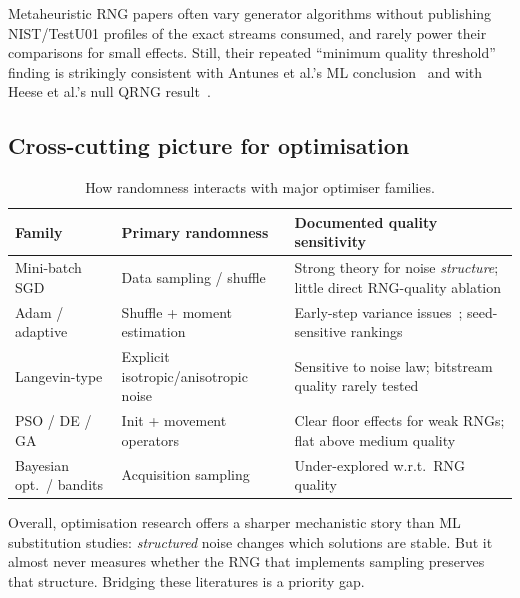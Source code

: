 \begin{remark}
Metaheuristic RNG papers often vary generator algorithms without publishing NIST/TestU01 profiles of the exact streams consumed, and rarely power their comparisons for small effects.
Still, their repeated ``minimum quality threshold'' finding is strikingly consistent with Antunes et al.'s ML conclusion~\cite{antunes2025influence} and with Heese et al.'s null QRNG result~\cite{heese2024biased}.
\end{remark}

\subsection{Cross-cutting picture for optimisation}

\begin{table}[t]
\centering
\caption{How randomness interacts with major optimiser families.}
\label{tab:opt-map}
\begin{tabular}{@{}p{3.2cm}p{4.2cm}p{4.4cm}@{}}
\toprule
\textbf{Family} & \textbf{Primary randomness} & \textbf{Documented quality sensitivity} \\
\midrule
Mini-batch SGD & Data sampling / shuffle & Strong theory for noise \emph{structure}; little direct RNG-quality ablation \\
Adam / adaptive & Shuffle + moment estimation & Early-step variance issues~\cite{liu2020radam}; seed-sensitive rankings \\
Langevin-type & Explicit isotropic/anisotropic noise & Sensitive to noise law; bitstream quality rarely tested \\
PSO / DE / GA & Init + movement operators & Clear floor effects for weak RNGs; flat above medium quality~\cite{bastos2009pso,ma2014comparison} \\
Bayesian opt.\ / bandits & Acquisition sampling & Under-explored w.r.t.\ RNG quality \\
\bottomrule
\end{tabular}
\end{table}

Overall, optimisation research offers a sharper mechanistic story than ML substitution studies: \emph{structured} noise changes which solutions are stable.
But it almost never measures whether the RNG that implements sampling preserves that structure.
Bridging these literatures is a priority gap.
